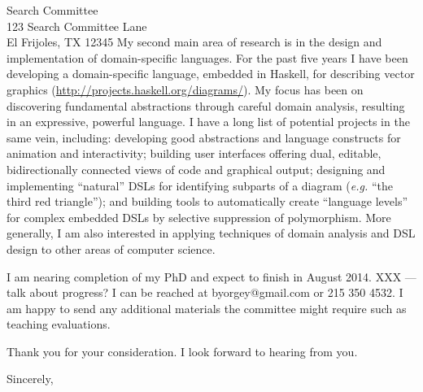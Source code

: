 \documentclass{letter}
\newif\ifteaching
\def\thereaddress{Search Committee \\ 123 Search Committee Lane \\ El
  Frijoles, TX 12345}
\begin{document}
\begin{letter}{\thereaddress}
My second main area of research is in the design and implementation of
domain-specific languages.  For the past five years I have been
developing a domain-specific language, embedded in Haskell, for
describing vector graphics
(\url{http://projects.haskell.org/diagrams/}).  My focus has been on
discovering fundamental abstractions through careful domain analysis,
resulting in an expressive, powerful language.  I have a long list of
potential projects in the same vein\ifteaching---many of which are
ripe for student involvement---\else, \fi including: developing good
abstractions and language constructs for animation and interactivity;
building user interfaces offering dual, editable, bidirectionally
connected views of code and graphical output; designing and
implementing ``natural'' DSLs for identifying subparts of a diagram
(\emph{e.g.} ``the third red triangle''); and building tools to
automatically create ``language levels'' for complex embedded DSLs by
selective suppression of polymorphism.  More generally, I am also
interested in applying techniques of domain analysis and DSL design to
other areas of computer science.  \fi %

\ifteaching
I have extensive teaching experience, including two years as a high
school teacher and a number of courses at Penn as both a teaching
assistant and primary instructor.  Most notably, I designed and taught
a full-credit undergraduate course titled ``The Art of Recursion''
XXX.  Popular.  YYY need to say something place-specific about
teaching, perhaps.
\fi %


I am nearing completion of my PhD and expect to finish in August 2014.
XXX --- talk about progress?  I can be reached at
\textsf{byorgey@gmail.com} or \textsf{215 350 4532}.  I am happy to
send any additional materials the committee might require such as
teaching evaluations.

Thank you for your consideration.  I look forward to hearing from you.

\closing{Sincerely,}

\end{letter}
\end{document}
